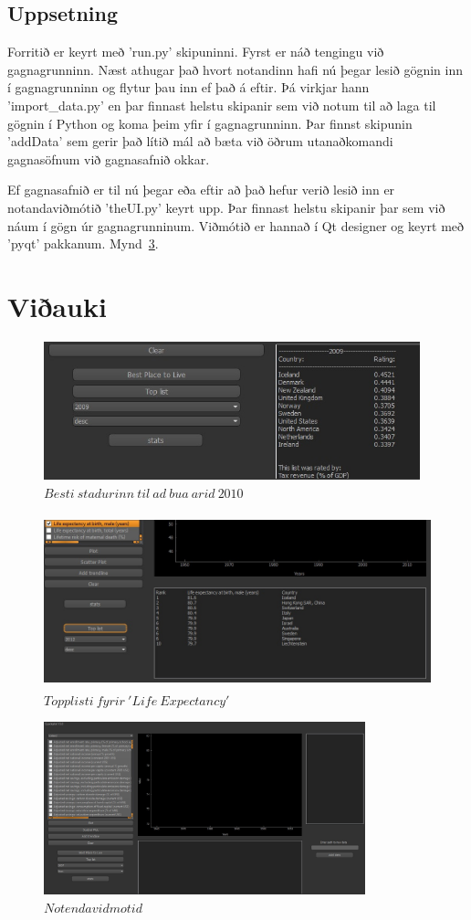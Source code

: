 \documentclass[11pt,a4paper]{amsart}
\theoremstyle{plain}
\theoremstyle{definition}
\theoremstyle{remark}
\begin{document}
\subsection{Uppsetning}
Forritið er keyrt með 'run.py' skipuninni. Fyrst er náð tengingu við gagnagrunninn. Næst athugar það hvort notandinn hafi nú þegar lesið gögnin inn í gagnagrunninn og flytur þau inn ef það á eftir. Þá virkjar hann 'import\_data.py' en þar finnast helstu skipanir sem við notum til að laga til gögnin í Python og koma þeim yfir í gagnagrunninn. Þar finnst skipunin 'addData' sem gerir það lítið mál að bæta við öðrum utanaðkomandi gagnasöfnum við gagnasafnið okkar.\par
Ef gagnasafnið er til nú þegar eða eftir að það hefur verið lesið inn er notandaviðmótið 'theUI.py' keyrt upp. Þar finnast helstu skipanir þar sem við náum í gögn úr gagnagrunninum. Viðmótið er hannað í Qt designer og keyrt með 'pyqt' pakkanum. Mynd~\ref{fig:gui}.

\newpage

\section{Viðauki}
\begin{figure}[H]
\includegraphics[height=40mm]{images/best.jpg}
\caption{$ Besti\ stadurinn\ til\ ad\ bua\ arid\ 2010 $\label{fig:best}}
\end{figure}

\begin{figure}[H]
\includegraphics[height=50mm]{images/topList_life.jpg}
\caption{$ Topplisti\ fyrir\ 'Life\ Expectancy' $\label{fig:topp}}
\end{figure}

\begin{figure}[H]
\includegraphics[height=50mm]{images/gui_front.jpg}
\caption{$ Notendavidmotid $\label{fig:gui}}
\end{figure}
\end{document}
